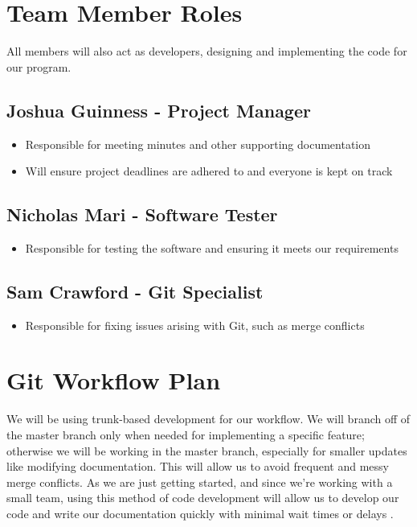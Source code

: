 \documentclass{article}
\begin{document}
\section{Team Member Roles}
\label{roles}
All members will also act as developers, designing and implementing the code for 
our program.

\subsection{Joshua Guinness - Project Manager}
\begin{itemize}
\item Responsible for meeting minutes and other supporting documentation
\item Will ensure project deadlines are adhered to and everyone is kept on track
\end{itemize}

\subsection{Nicholas Mari - Software Tester}
\begin{itemize}
\item Responsible for testing the software and ensuring it meets our requirements
\end{itemize}

\subsection{Sam Crawford - Git Specialist}
\begin{itemize}
\item Responsible for fixing issues arising with Git, such as merge conflicts 
\end{itemize}

\section{Git Workflow Plan}
We will be using trunk-based development for our workflow. We will branch off 
of the master branch only when needed for implementing a specific feature; 
otherwise we will be working in the master branch, especially for 
smaller updates like modifying documentation. This will allow us to avoid 
frequent and messy merge conflicts. As we are just getting started, and since 
we're working with a small team, using this method of code development will 
allow us to develop our code and write our documentation quickly with minimal 
wait times or delays \cite{trunkbased}.
\end{document}
